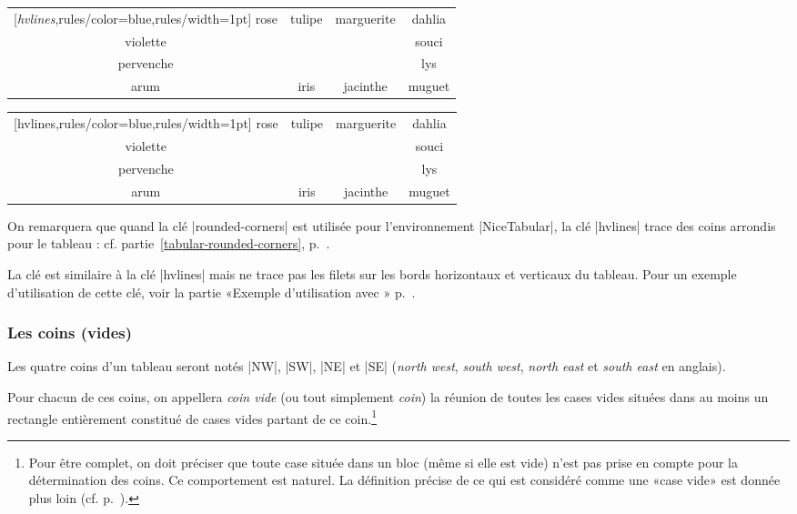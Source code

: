 \documentclass[dvipsnames]{article}%
\begin{document}
\smallskip
\begin{Code}
\begin{NiceTabular}{cccc}[\emph{hvlines},rules/color=blue,rules/width=1pt]
rose      & tulipe & marguerite & dahlia \\
violette  &   & & souci \\
pervenche & & & lys \\
arum      & iris & jacinthe & muguet
\end{NiceTabular}
\end{Code}
%
\begin{center}
\begin{NiceTabular}{cccc}[hvlines,rules/color=blue,rules/width=1pt]
rose      & tulipe & marguerite & dahlia \\
violette  &   & & souci \\
pervenche & & & lys \\
arum      & iris & jacinthe & muguet
\end{NiceTabular}
\end{center}

\medskip
On remarquera que quand la clé |rounded-corners| est utilisée pour
l'environnement |{NiceTabular}|, la clé |hvlines| trace des coins
arrondis pour le tableau : cf. partie~\ref{tabular-rounded-corners},
p.~\pageref{tabular-rounded-corners}.


\medskip
La clé  est similaire à la clé |hvlines| mais
ne trace pas les filets sur les bords horizontaux et verticaux du tableau. Pour
un exemple d'utilisation de cette clé, voir la partie «Exemple d'utilisation
avec » p.~\pageref{tcolorbox}.


\medskip
\subsubsection{Les coins (vides)}
\label{corners}


Les quatre coins d'un tableau seront notés |NW|, |SW|, |NE| et |SE| (\emph{north
  west}, \emph{south west}, \emph{north east} et \emph{south east} en anglais).

\smallskip
Pour chacun de ces coins, on appellera \emph{coin vide} (ou tout simplement
\emph{coin}) la réunion de toutes les cases vides situées dans au moins un
rectangle entièrement constitué de cases vides partant de ce coin.\footnote{Pour
  être complet, on doit préciser que toute case située dans un bloc (même si
  elle est vide) n'est pas prise en compte pour la détermination des coins. Ce
  comportement est naturel. La définition précise de ce qui est considéré comme
  une «case vide» est donnée plus loin (cf. p.~\pageref{empty-cells}).}
\end{document}
